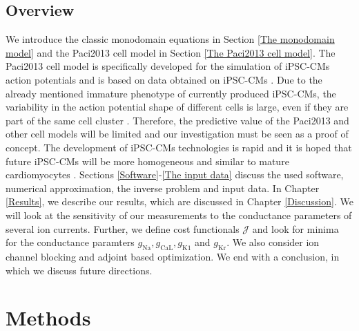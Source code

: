 \documentclass{article}
\begin{document}
\subsection{Overview}
We introduce the classic monodomain equations in Section \ref{The monodomain model} and the Paci2013 cell model in Section \ref{The Paci2013 cell model}. The Paci2013 cell model is specifically developed for the simulation of iPSC-CMs action potentials and is based on data obtained on iPSC-CMs \cite{Paci2013, Ma2011}. Due to the already mentioned immature phenotype of currently produced iPSC-CMs, the variability in the action potential shape of different cells is large, even if they are part of the same cell cluster \cite{Blazeski, Zhu2016}. Therefore, the predictive value of the Paci2013 and other cell models will be limited and our investigation must be seen as a proof of concept. The development of iPSC-CMs technologies is rapid and it is hoped that future iPSC-CMs will be more homogeneous and similar to mature cardiomyocytes \cite{Denning2016}. Sections \ref{Software}-\ref{The input data} discuss the used software, numerical approximation, the inverse problem and input data. In Chapter \ref{Results}, we describe our results, which are discussed in Chapter \ref{Discussion}. We will look at the sensitivity of our measurements to the conductance parameters of several ion currents. Further, we define cost functionals $\mathcal{J}$ and look for minima for the conductance paramters $g_{\mathrm{Na}}, g_{\mathrm{CaL}}, g_{\mathrm{K1}}$ and $g_{\mathrm{Kr}}$. We also consider ion channel blocking and adjoint based optimization. We end with a conclusion, in which we discuss future directions.

\section{Methods} \label{Methods}
\end{document}

